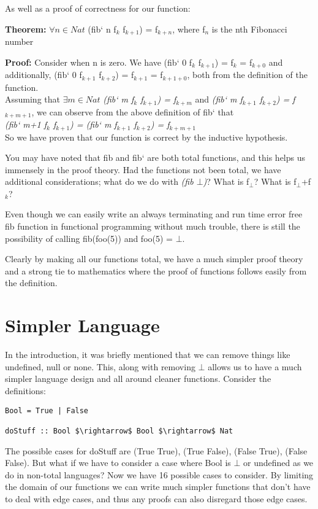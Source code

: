 \documentclass[12pt]{article}
\begin{document}
As well as a proof of correctness for our function:

\begin{framed}
\textbf{Theorem:} $\forall n \in Nat$ (fib` n f$_{k}$ f$_{k+1}$) = f$_{k+n}$, where f$_{n}$ is the nth Fibonacci number
\par
\textbf{Proof:} Consider when n is zero. We have (fib` 0 f$_{k}$ f$_{k+1}$) = f$_{k}$ = f$_{k+0}$ and additionally, (fib` 0 f$_{k+1}$ f$_{k+2}$) = f$_{k+1}$ = f$_{k+1+0}$, both from the definition of the function.
\\
Assuming that $\exists m \in Nat$ \emph{(fib` m f$_{k}$ f$_{k+1}$) = f$_{k+m}$} and
\emph{(fib` m f$_{k+1}$ f$_{k+2}$) = f$_{k+m+1}$}, we can observe from the above definition of fib` that \\
\emph{(fib` m+1 f$_{k}$ f$_{k+1}$) = (fib` m f$_{k+1}$ f$_{k+2}$) = f$_{k+m+1}$} \\ 
So we have proven that our function is correct by the inductive hypothesis.
\end{framed}
\par
You may have noted that fib and fib` are both total functions, and this helps us immensely in the proof theory. Had the functions not been total, we have additional considerations; what do we do with \emph{(fib $\bot$)}? What is f$_{\bot}$? What is f$_{\bot}$+f$_{k}$?
 
Even though we can easily write an always terminating and run time error free fib function in functional programming without much trouble, there is still the possibility of calling fib(foo(5)) and foo(5) = $\bot$.

Clearly by making all our functions total, we have a much simpler proof theory and a strong tie to mathematics where the proof of functions follows easily from the definition.

\section{Simpler Language}

In the introduction, it was briefly mentioned that we can remove things like undefined, null or none. This, along with removing $\bot$ allows us to have a much simpler language design and all around cleaner functions. Consider the definitions:
\bigskip
\begin{lstlisting}[frame=single,mathescape=true]
Bool = True | False

doStuff :: Bool $\rightarrow$ Bool $\rightarrow$ Nat
\end{lstlisting}
The possible cases for doStuff are (True True), (True False), (False True), (False False). But what if we have to consider a case where Bool is $\bot$ or undefined as we do in non-total languages? Now we have 16 possible cases to consider. By limiting the domain of our functions we can write much simpler functions that don't have to deal with edge cases, and thus any proofs can also disregard those edge cases.
\end{document}
